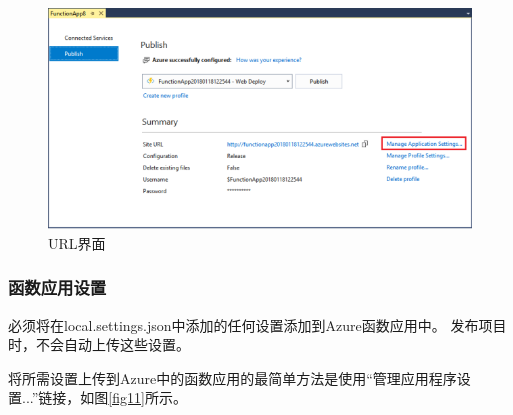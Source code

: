 \documentclass[11pt]{article}
\begin{document}
\begin{figure}[h]	
	\centering
	\includegraphics[scale=0.6]{figs/10.png}        %
	\caption{URL界面}
	\label{fig10}	
\end{figure}

\subsubsection{函数应用设置} 
必须将在local.settings.json中添加的任何设置添加到Azure函数应用中。 发布项目时，不会自动上传这些设置。

将所需设置上传到Azure中的函数应用的最简单方法是使用“管理应用程序设置...”链接，如图\ref{fig11}所示。
\end{document}
